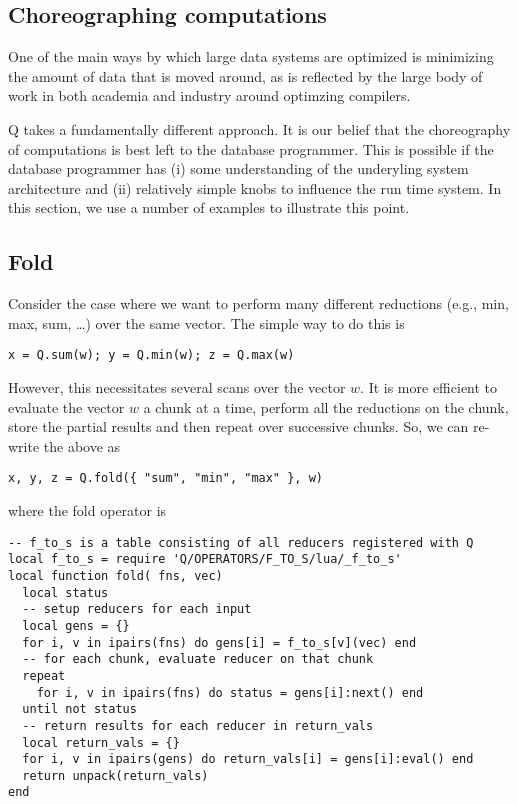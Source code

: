 \subsection{Choreographing computations}

One of the main ways by which large data systems are optimized is minimizing the
amount of data that is moved around, as is reflected by the large body of work in
both academia and industry around optimzing compilers. 

Q takes a fundamentally different approach. It is our belief that the
choreography of computations is best left to the database programmer. This is
possible if the database programmer has (i) some understanding of the underyling
system architecture and (ii) relatively simple knobs to influence the run time
system.  In this section, we use a number of examples to illustrate this point.


\subsection{Fold}
Consider the case where we want to perform many different reductions (e.g., min,
max, sum, \ldots) over the same vector. The simple way to do this is
\begin{verbatim}
x = Q.sum(w); y = Q.min(w); z = Q.max(w)
\end{verbatim}
However, this necessitates several scans over the vector \(w\). It is more
efficient to evaluate the vector \(w\) a chunk at a time, perform all the
reductions on the chunk, store the partial results and then repeat over
successive chunks. So, we can re-write the above as 
\begin{verbatim}
x, y, z = Q.fold({ "sum", "min", "max" }, w)
\end{verbatim}
where the fold operator is 
\begin{verbatim}
-- f_to_s is a table consisting of all reducers registered with Q
local f_to_s = require 'Q/OPERATORS/F_TO_S/lua/_f_to_s'
local function fold( fns, vec)
  local status
  -- setup reducers for each input 
  local gens = {} 
  for i, v in ipairs(fns) do gens[i] = f_to_s[v](vec) end
  -- for each chunk, evaluate reducer on that chunk
  repeat 
    for i, v in ipairs(fns) do status = gens[i]:next() end 
  until not status
  -- return results for each reducer in return_vals
  local return_vals = {}
  for i, v in ipairs(gens) do return_vals[i] = gens[i]:eval() end
  return unpack(return_vals)
end
\end{verbatim}
